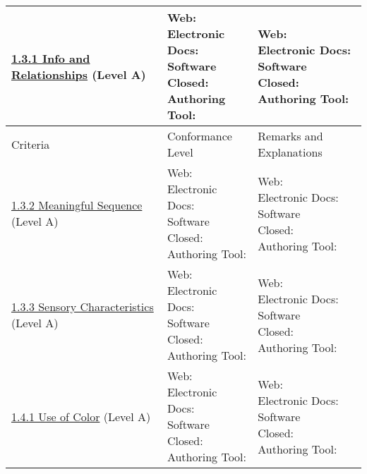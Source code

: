 \documentclass[a4paper]{report}
\begin{document}
\begin{longtable}{|l|l|l|}
        \hline
        \href{http://www.w3.org/TR/WCAG20/#content-structure-separation-programmatic}{1.3.1 Info and Relationships} (Level A) &
        \makecell{Web: \\ Electronic Docs: \\ Software \\ Closed: \\ Authoring Tool:} & \makecell{Web: \\ Electronic Docs: \\ Software \\ Closed: \\ Authoring Tool:}\\
        \hline \newpage \hline
        Criteria & Conformance Level & Remarks and Explanations \\
        \hline
    \href{http://www.w3.org/TR/WCAG20/#content-structure-separation-programmatic}{1.3.2 Meaningful Sequence} (Level A) &
        \makecell{Web: \\ Electronic Docs: \\ Software \\ Closed: \\ Authoring Tool:} & \makecell{Web: \\ Electronic Docs: \\ Software \\ Closed: \\ Authoring Tool:} \\
 \hline
        \href{http://www.w3.org/TR/WCAG20/#content-structure-separation-understanding}{1.3.3 Sensory Characteristics} (Level A) & \makecell{Web: \\ Electronic Docs: \\ Software \\ Closed: \\ Authoring Tool:} & \makecell{Web: \\ Electronic Docs: \\ Software \\ Closed: \\ Authoring Tool:}\\
        \hline
        \href{http://www.w3.org/TR/WCAG20/#visual-audio-contrast-without-color}{1.4.1 Use of Color} (Level A) & \makecell{Web: \\ Electronic Docs: \\ Software \\ Closed: \\ Authoring Tool:} & \makecell{Web: \\ Electronic Docs: \\ Software \\ Closed: \\ Authoring Tool:}\\

\end{longtable}
\end{document}
